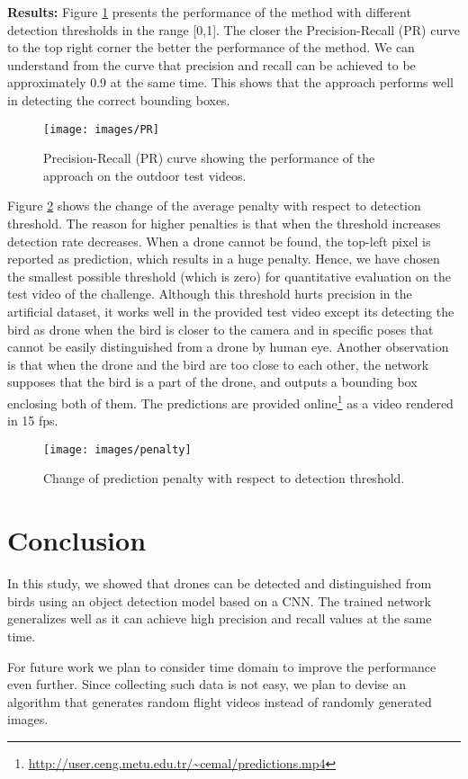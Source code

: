 \documentclass[10pt,twocolumn,letterpaper]{article}
\begin{document}
\textbf{Results:} Figure \ref{prcurve} presents the performance of the method with different detection thresholds in the range [0,1]. The closer the Precision-Recall (PR) curve to the top right corner the better the performance of the method. We can understand from the curve that precision and recall can be achieved to be approximately 0.9 at the same time. This shows that the approach performs well in detecting the correct bounding boxes.
\begin{figure}
\centering
	\texttt{[image: images/PR]}
    \caption{Precision-Recall (PR) curve showing the performance of the approach on the outdoor test videos.}
    \label{prcurve}
\end{figure}\par
Figure \ref{penalty} shows the change of the average penalty with respect to detection threshold. The reason for higher penalties is that when the threshold increases detection rate decreases.  When a drone cannot be found, the top-left pixel is reported as prediction, which results in a huge penalty. Hence, we have chosen the smallest possible threshold (which is zero) for quantitative evaluation on the test video of the challenge. Although this threshold hurts precision in the artificial dataset, it works well in the provided test video except its detecting the bird as drone when the bird is closer to the camera and in specific poses that cannot be easily distinguished from a drone by human eye. Another observation is that when the drone and the bird are too close to each other, the network supposes that the bird is a part of the drone, and outputs a bounding box enclosing both of them. The predictions are provided online\footnote{\url{http://user.ceng.metu.edu.tr/~cemal/predictions.mp4}} as a video rendered in 15 fps.
\begin{figure}
\centering
	\texttt{[image: images/penalty]}
    \caption{Change of prediction penalty with respect to detection threshold.}
    \label{penalty}
\end{figure}
\section{Conclusion}
In this study, we showed that drones can be detected and distinguished from birds using an object detection model based on a CNN. The trained network generalizes well as it can achieve high precision and recall values at the same time. 
\par
For future work we plan to consider time domain to improve the performance even further. Since collecting such data is not easy, we plan to devise an algorithm that generates random flight videos instead of randomly generated images.

{\small

}
\end{document}
